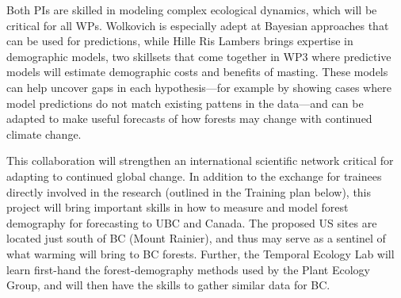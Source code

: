 \documentclass[12pt,oneside]{article}
\begin{document}
Both PIs are skilled in modeling complex ecological dynamics, which will be critical for all WPs. Wolkovich is especially adept at Bayesian approaches that can be used for predictions,\cite{ospreebbms,dan2021je,decsens,morales2024phylogenetic} while Hille Ris Lambers brings expertise in demographic models,\cite{hille2002density,clark2003estimating,ford2020soil} two skillsets that come together in WP3 where predictive models will estimate demographic costs and benefits of masting. These models can help uncover gaps in each hypothesis---for example by showing cases where model predictions do not match existing pattens in the data---and can be adapted to make useful forecasts of how forests may change with continued climate change.\cite{IPCC:2014sm} %

This collaboration will strengthen an international scientific network critical for adapting to continued global change. In addition to the exchange for trainees directly involved in the research (outlined in the Training plan below), this project will bring important skills in how to measure and model forest demography for forecasting to UBC and Canada. The proposed US sites are located just south of BC (Mount Rainier), and thus may serve as a sentinel of what warming will bring to BC forests. Further, the Temporal Ecology Lab will learn first-hand the forest-demography methods used by the Plant Ecology Group, and will then have the skills to gather similar data for BC. %
\end{document}

